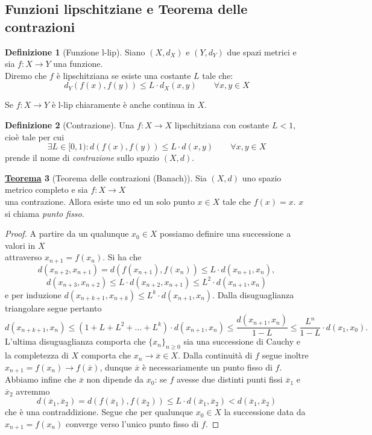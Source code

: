 \documentclass[a4paper,twoside]{article}
\theoremstyle{definition}
\newtheorem{theorem}{\color{Red}\underline{\textrm Teorema}}
\newtheorem{definizione}[theorem]{Definizione}
\numberwithin{theorem}{section}
\begin{document}
\subsection{Funzioni lipschitziane e Teorema delle contrazioni}
\begin{definizione}[Funzione l-lip]
Siano $(X,d_X)$ e $(Y,d_Y)$ due spazi metrici e sia $f:X\to Y$ una funzione.\\ Diremo che $f$ è lipschitziana se esiste una costante $L$ tale che: $$d_Y(f(x),f(y))\leq L\cdot d_X(x,y)\qquad \forall x,y\in X$$    
\end{definizione}
Se $f:X\to Y$ è l-lip chiaramente è anche continua in $X$.
\begin{definizione}[Contrazione]
Una $f:X\to X$ lipschitziana con costante $L<1$, cioè tale per cui
$$\exists L\in[0,1): d(f(x),f(y))\leq L\cdot d(x,y)\qquad\forall x,y\in X$$
prende il nome di \emph{contrazione} sullo spazio $(X,d)$.
\end{definizione}
\begin{theorem}[Teorema delle contrazioni (Banach)]
Sia $(X,d)$ uno spazio metrico completo e sia $f:X\to X$\\ una contrazione. Allora esiste uno ed un solo punto $x\in X$ tale che $f(x)=x$. $x$ si chiama \emph{punto fisso}.    
\end{theorem}
\begin{proof} A partire da un qualunque $x_0\in X$ possiamo definire una successione a valori in $X$\\ attraverso $x_{n+1}=f(x_n)$. Si ha che 
$$d(x_{n+2},x_{n+1}) = d(f(x_{n+1}),f(x_n)) \leq L\cdot d(x_{n+1},x_n), $$
$$d(x_{n+3},x_{n+2}) \leq L\cdot d(x_{n+2},x_{n+1}) \leq L^2\cdot d(x_{n+1},x_n)$$
e per induzione $d(x_{n+k+1},x_{n+k})\leq L^k\cdot d(x_{n+1},x_{n})$. Dalla disuguaglianza triangolare segue pertanto 
$$ d(x_{n+k+1},x_{n}) \leq \left(1+L+L^2+\ldots+L^k\right)\cdot d(x_{n+1},x_n)\leq \frac{d(x_{n+1},x_n)}{1-L}\leq \frac{L^n}{1-L}\cdot  d(x_1,x_0).$$
L'ultima disuguaglianza comporta che $\{x_n\}_{n\geq 0}$ sia una successione di Cauchy e la completezza di $X$ comporta che $x_n\to \overline{x} \in X$. Dalla continuità di $f$ segue inoltre $x_{n+1}=f(x_n)\to f(\overline{x})$, dunque $\overline{x}$ è necessariamente un punto fisso di $f$. Abbiamo infine che $\overline{x}$ non dipende da $x_0$: se $f$ avesse due distinti punti fissi $\overline{x}_1$ e $\overline{x}_2$ avremmo 
$$ d(\overline{x}_1,\overline{x}_2) = d(f(\overline{x}_1),f(\overline{x}_2)) \leq L\cdot d(\overline{x}_1,\overline{x}_2) < d(\overline{x}_1,\overline{x}_2) $$
che è una contraddizione. Segue che per qualunque $x_0\in X$ la successione data da $x_{n+1}=f(x_n)$ converge verso l'unico punto fisso di $f$.   
\end{proof}
\end{document}
